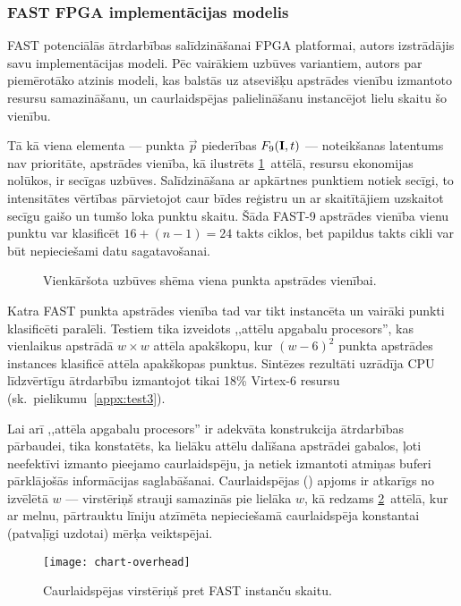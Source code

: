 \subsubsection{FAST FPGA implementācijas modelis} \label{sec:fast-fpga}
FAST potenciālās ātrdarbības salīdzināšanai FPGA platformai, autors
izstrādājis savu implementācijas modeli. Pēc vairākiem uzbūves variantiem,
autors par piemērotāko atzinis modeli, kas balstās uz atsevišķu apstrādes
vienību izmantoto resursu samazināšanu, un caurlaidspējas palielināšanu
instancējot lielu skaitu šo vienību.

Tā kā viena elementa --- punkta $\vec{p}$ piederības $F_9(\mathbf{I},t)$ ---
noteikšanas latentums nav prioritāte, apstrādes vienība, kā ilustrēts
\ref{fig:fast-fpga}~attēlā, resursu ekonomijas nolūkos, ir secīgas uzbūves.
Salīdzināšana ar apkārtnes punktiem notiek secīgi, to intensitātes vērtības
pārvietojot caur bīdes reģistru un ar skaitītājiem uzskaitot secīgu
gaišo un tumšo loka punktu skaitu. Šāda FAST-9 apstrādes vienība vienu punktu
var klasificēt $16+(n-1)=24$ takts ciklos, bet papildus takts cikli
var būt nepieciešami datu sagatavošanai.

\begin{figure}[tbh]
	\centering
	\def\svgwidth{\linewidth}
	{\small}
	\caption{Vienkāršota uzbūves shēma viena punkta apstrādes vienībai.}
	\label{fig:fast-fpga}
\end{figure}

Katra FAST punkta apstrādes vienība tad var tikt instancēta un vairāki
punkti klasificēti paralēli. Testiem tika izveidots
,,attēlu apgabalu procesors'', kas vienlaikus apstrādā $w \times w$ attēla
apakškopu, kur ${(w-6)}^2$ punkta apstrādes instances klasificē attēla
apakškopas punktus. Sintēzes rezultāti uzrādīja CPU līdzvērtīgu ātrdarbību
izmantojot tikai 18\% Virtex-6 resursu
(sk.~pielikumu~\ref{appx:test3}).

Lai arī ,,attēla apgabalu procesors'' ir adekvāta konstrukcija
ātrdarbības pārbaudei, tika konstatēts, ka lielāku attēlu dalīšana
apstrādei gabalos, ļoti neefektīvi izmanto pieejamo caurlaidspēju, ja
netiek izmantoti atmiņas buferi pārklājošās informācijas saglabāšanai.
Caurlaidspējas  () apjoms ir atkarīgs no
izvēlētā $w$ --- virstēriņš strauji samazinās pie lielāka $w$,
kā redzams \ref{fig:overhead}~attēlā, kur ar melnu, pārtrauktu līniju
atzīmēta nepieciešamā caurlaidspēja konstantai (patvaļīgi uzdotai)
mērķa veiktspējai.
\begin{figure}[tbh]
	\centering
	\texttt{[image: chart-overhead]}
	\caption{Caurlaidspējas virstēriņš pret FAST instanču skaitu.}
	\label{fig:overhead}
\end{figure}

